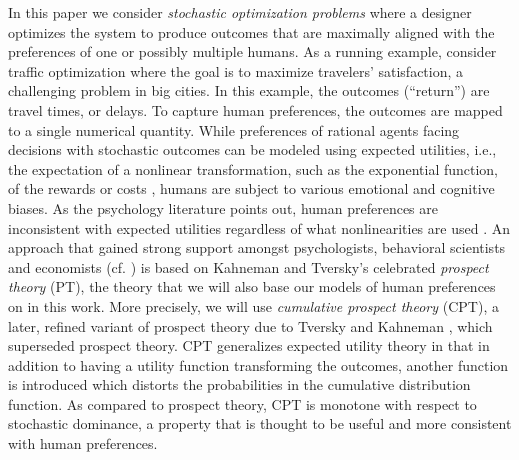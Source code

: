 In this paper we consider \emph{stochastic optimization problems}
where a designer optimizes the system 
to produce outcomes that are maximally aligned with the preferences of 
one or possibly multiple humans.
As a running example, consider traffic optimization where the goal is to maximize
travelers' satisfaction, a challenging problem 
in big cities.
In this example, the outcomes (``return'') are travel times, or delays. 
To capture human preferences, the outcomes are mapped to a single numerical quantity.
While preferences of rational agents facing decisions with stochastic outcomes can be modeled using expected utilities,
i.e., the expectation of a nonlinear transformation, such as the exponential function, of the rewards or costs
\cite{NeuMo44,fishburn1970expectedutility}, 
	humans are subject to various emotional and cognitive biases.
	As the psychology literature points out, human preferences 
	are inconsistent with expected utilities regardless of what nonlinearities are used
	 \cite{allais53,ellsberg61,kahneman1979prospect}.
An approach that gained 
	strong support amongst psychologists, behavioral scientists and economists (cf. \cite{starmer2000developments,quiggin2012generalized})
	is based on Kahneman and Tversky's \cite{kahneman1979prospect} celebrated \emph{prospect theory} (PT),
	the theory that we will also base our models of human preferences on
	 in this work.
More precisely, we will use \emph{cumulative prospect theory} (CPT),
 	a later, refined variant of prospect theory due to Tversky and Kahneman \cite{tversky1992advances}, 
	which superseded prospect theory.
CPT generalizes expected utility theory in that in addition to having a utility function transforming
	the outcomes, another function is introduced which distorts the probabilities in the cumulative distribution function.
As compared to prospect theory, CPT is monotone with respect to stochastic dominance, a property
	that is thought to be useful and more consistent with human preferences.
	

